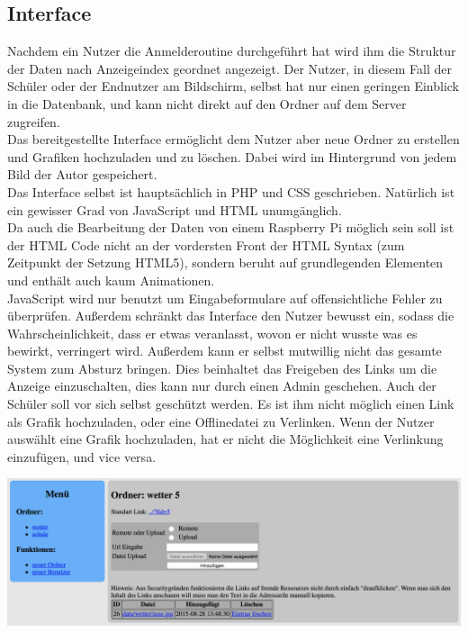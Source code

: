 \subsection{Interface} %
Nachdem ein Nutzer die Anmelderoutine durchgeführt hat wird ihm die Struktur der Daten nach Anzeigeindex geordnet angezeigt.
Der Nutzer, in diesem Fall der Schüler oder der Endnutzer am Bildschirm,
selbst hat nur einen geringen Einblick in die Datenbank, und kann nicht direkt auf den Ordner auf dem Server zugreifen.\\
Das bereitgestellte Interface ermöglicht dem Nutzer aber neue Ordner
zu erstellen und Grafiken hochzuladen und zu löschen.
Dabei wird im Hintergrund von jedem Bild der Autor gespeichert. \\
Das Interface selbst ist hauptsächlich in PHP und CSS geschrieben.
Natürlich ist ein gewisser Grad von JavaScript und HTML unumgänglich. \\
Da auch die Bearbeitung der Daten von einem Raspberry Pi möglich sein soll ist der HTML Code nicht an der vordersten Front der HTML Syntax (zum Zeitpunkt der Setzung HTML5),
sondern beruht auf grundlegenden Elementen und enthält auch kaum Animationen. \\
JavaScript wird nur benutzt um Eingabeformulare auf offensichtliche Fehler zu überprüfen.
Außerdem schränkt das Interface den Nutzer bewusst ein,
sodass die Wahrscheinlichkeit,
dass er etwas veranlasst, wovon er nicht wusste was es bewirkt, verringert wird.
Außerdem kann er selbst mutwillig nicht das gesamte System zum Absturz bringen.
Dies beinhaltet das Freigeben des Links um die Anzeige einzuschalten,
dies kann nur durch einen Admin geschehen.
Auch der Schüler soll vor sich selbst geschützt werden.
Es ist ihm nicht möglich einen Link als Grafik hochzuladen,
oder eine Offlinedatei zu Verlinken.
Wenn der Nutzer auswählt eine Grafik hochzuladen,
hat er nicht die Möglichkeit eine Verlinkung einzufügen, und vice versa.
\begin{center}
\includegraphics[width=\linewidth]{imgs/wms/wms_interface.png}
\end{center}

